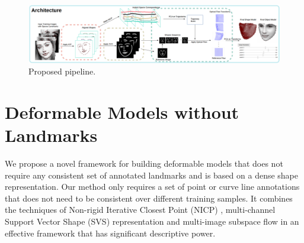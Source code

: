 \begin{figure}[t!]
    \centering
        \includegraphics[width=\textwidth]{resources/architecture}
    \caption{Proposed pipeline.}
    \label{fig:archi}
\end{figure}

\section{Deformable Models without Landmarks}



We propose a novel framework for building deformable models that does not require any consistent set of annotated landmarks and is based on a dense shape representation. Our method only requires a set of point or curve line annotations that does not need to be consistent over different training samples. It combines the techniques of Non-rigid Iterative Closest Point (NICP) \cite{Amber2007}, multi-channel Support Vector Shape (SVS) \cite{Nguyen2013} representation and multi-image subspace flow \cite{} in an effective framework that has significant descriptive power.

